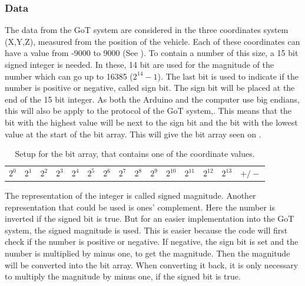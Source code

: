 \subsubsection{Data}
The data from the GoT system are considered in the three coordinates system (X,Y,Z), measured from the position of the vehicle. Each of these coordinates can have a value from -9000 to 9000 (See ). To contain a number of this size, a 15 bit signed integer is needed. In these, 14 bit are used for the magnitude of the number which can go up to 16385 ($2^{14}-1$). The last bit is used to indicate if the number is positive or negative, called sign bit. The sign bit will be placed at the end of the 15 bit integer. As both the Arduino and the computer use big endians, this will also be apply to the protocol of the GoT system,. This means that the bit with the highest value will be next to the sign bit and the bit with the lowest value at the start of the bit array. This will give the bit array seen on .

\begin{table}[H]
\centering
\begin{tabular}{|>{\centering\arraybackslash}m{0.5cm}|>{\centering\arraybackslash}m{0.5cm}|>{\centering\arraybackslash}m{0.5cm}|>{\centering\arraybackslash}m{0.5cm}|>{\centering\arraybackslash}m{0.5cm}|>{\centering\arraybackslash}m{0.5cm}|>{\centering\arraybackslash}m{0.5cm}|>{\centering\arraybackslash}m{0.5cm}|>{\centering\arraybackslash}m{0.5cm}|>{\centering\arraybackslash}m{0.5cm}|>{\centering\arraybackslash}m{0.5cm}|>{\centering\arraybackslash}m{0.5cm}|>{\centering\arraybackslash}m{0.5cm}|>{\centering\arraybackslash}m{0.5cm}|>{\centering\arraybackslash}m{0.65cm}|}
\multicolumn{15}{c}{15 bits} \\
\hline
$2^0$ & $2^1$ & $2^2$ & $2^3$ & $2^4$ & $2^5$ & $2^6$ & $2^7$ & $2^8$ & $2^9$ & $2^{10}$ & $2^{11}$ & $2^{12}$ & $2^{13}$ & $+/-$ \\
\hline
\end{tabular}
\caption{Setup for the bit array, that contains one of the coordinate values.}
\label{CoorSetup}
\end{table}

The representation of the integer is called signed magnitude. Another representation that could be used is ones' complement. Here the number is inverted if the signed bit is true. But for an easier implementation into the GoT system, the signed magnitude is used. This is easier because the code will first check if the number is positive or negative. If negative, the sign bit is set and the number is multiplied by minus one, to get the magnitude. Then the magnitude will be converted into the bit array. When converting it back, it is only necessary to multiply the magnitude by minus one, if the signed bit is true.

